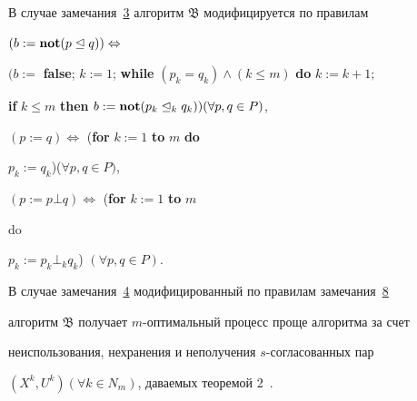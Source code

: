 \smallskip



\hypertarget{ovch:zam8}{}



\begin{remark}[8] В случае замечания~\hyperlink{ovch:zam3}{3} алгоритм \hyperlink{ovch:alg}{$\mathfrak{B}$} модифицируется по правилам

\begin{center}

$(b:={\bf not}(p\trianglelefteq q)) \Leftrightarrow $



$(b:=$ {\bf false}; $k:=1$; {\bf while} $(p_k =q_k)\wedge (k\leq m)$  {\bf do} $k:=k+1;$



{\bf if} $k\le m$ {\bf then} $b:={\bf not}( p_k

\trianglelefteq_k q_k )) (\forall p,q\in P)$,



$(p:=q)\Leftrightarrow$ ({\bf for} $k:=1$ {\bf to} $m$ {\bf do}

$p_k :=q_k$)($\forall p,q\in P)$,



$(p:=p\bot q)\Leftrightarrow$ ({\bf for} $k:=1$ {\bf to} $m$ {\bf

do} $p_k :=p_k \bot_k q_k$) $(\forall p,q\in P)$.

\end{center}

\end{remark}



\smallskip



\begin{remark}[9] В случае замечания~\hyperlink{ovch:zam4}{4} модифицированный по правилам замечания~\hyperlink{ovch:zam8}{8}

алгоритм \hyperlink{ovch:alg}{$\mathfrak{B}$} получает $m$-оптимальный процесс проще алгоритма \cite{ovchinnikov:bib2} за счет

неиспользования, нехранения и неполучения $s$-согласованных пар

$(X^k,U^k)(\forall k\in N_m )$, даваемых теоремой 2~\cite{ovchinnikov:bib2}.



\end{remark}



\smallskip



